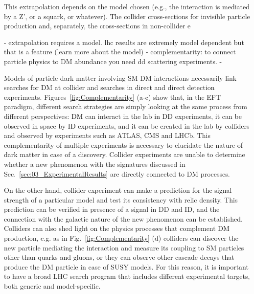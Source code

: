 This extrapolation depends on the model chosen (e.g., the interaction is mediated by a Z’, or a squark, or whatever).
The collider cross-sections for invisible particle production and, separately, the cross-sections in non-collider e 


- extrapolation requires a model. lhc results are extremely model dependent but that is a feature (learn more about the model)
- complementarity: to connect particle physics to DM abundance you need dd scattering experiments.
- 


Models of particle dark matter involving SM-DM interactions necessarily link searches for DM at collider and searches in direct and direct detection experiments. Figures~\ref{fig:Complementarity} (a-c) show that, in the EFT paradigm, different search strategies are simply looking at the same process from different perspectives: DM can interact in the lab in DD experiments, it can be observed in space %
by ID experiments, and it can be created in the lab by colliders and observed by experiments such as ATLAS, CMS and LHCb. This complementarity of multiple experiments is necessary to elucidate the nature of dark matter in case of a discovery. Collider experiments are unable to determine whether a new phenomenon with the signatures discussed in Sec.~\ref{sec:03_ExperimentalResults} are directly connected to DM processes. %

On the other hand, collider experiment can make a prediction for the signal strength of a particular model and test its consistency with relic density. This prediction can be verified in presence of a signal in DD and ID, and the connection with the galactic nature of the new phenomenon can be established. Colliders can also shed light on the physics processes that complement DM production, e.g. as in Fig.~\ref{fig:Complementarity} (d) colliders can discover the new particle mediating the interaction and measure its coupling to SM particles other than quarks and gluons, or they can observe other cascade decays that produce the DM particle in case of SUSY models. For this reason, it is important to have a broad LHC search program that includes different experimental targets, both generic and model-specific.  %


